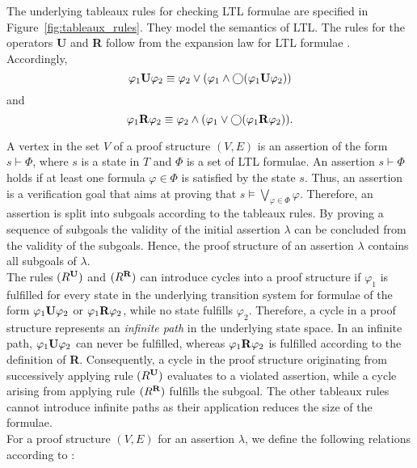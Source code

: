 \documentclass[a4paper, 12pt, twoside]{report}
\begin{document}
	The underlying tableaux rules for checking LTL formulae are specified in Figure~\ref{fig:tableaux_rules}. They model the semantics of LTL. The rules for the operators \textbf{U} and \textbf{R} follow from the expansion law for LTL formulae \cite{baier2008principles}. Accordingly,
	\[\varphi_1 \text{\textbf{U}} \varphi_2 \equiv \varphi_2 \vee (\varphi_1 \wedge \bigcirc (\varphi_1 \text{\textbf{U}} \varphi_2))\] and
	\[\varphi_1 \text{\textbf{R}} \varphi_2 \equiv \varphi_2 \wedge (\varphi_1 \vee \bigcirc (\varphi_1 \text{\textbf{R}} \varphi_2)).\]	
	
	A vertex in the set $V$ of a proof structure $(V,E)$ is an assertion of the form $s \vdash \Phi$, where $s$ is a state in $T$ and $\Phi$ is a set of LTL formulae. An assertion $s \vdash \Phi$ holds if at least one formula $\varphi \in \Phi$ is satisfied by the state $s$. Thus, an assertion is a verification goal that aims at proving that $s\models \bigvee_{\varphi \in \Phi}\varphi$. Therefore, an assertion is split into subgoals according to the tableaux rules. By proving a sequence of subgoals the validity of the initial assertion $\lambda$ can be concluded from the validity of the subgoals. Hence, the proof structure of an assertion $\lambda$ contains all subgoals of $\lambda$. \\
	
	The rules $(R^{\text{\textbf{U}}})$ and $(R^{\text{\textbf{R}}})$ can introduce cycles into a proof structure if $\varphi_1$ is fulfilled for every state in the underlying transition system for formulae of the form $\varphi_1 \text{\textbf{U}} \varphi_2$ or $\varphi_1 \text{\textbf{R}} \varphi_2$, while no state fulfills $\varphi_2$. Therefore, a cycle in a proof structure represents an \textit{infinite path} in the underlying state space. In an infinite path, $\varphi_1 \text{\textbf{U}} \varphi_2$ can never be fulfilled, whereas $\varphi_1 \text{\textbf{R}} \varphi_2$ is fulfilled according to the definition of \textbf{R}. Consequently, a cycle in the proof structure originating from successively applying rule $(R^{\text{\textbf{U}}})$ evaluates to a violated assertion, while a cycle arising from applying rule $(R^{\text{\textbf{R}}})$ fulfills the subgoal. The other tableaux rules cannot introduce infinite paths as their application reduces the size of the formulae. \\
	
	For a proof structure $(V,E)$ for an assertion $\lambda$, we define the following relations according to \cite{bhat1995efficient}:
	
\end{document}
